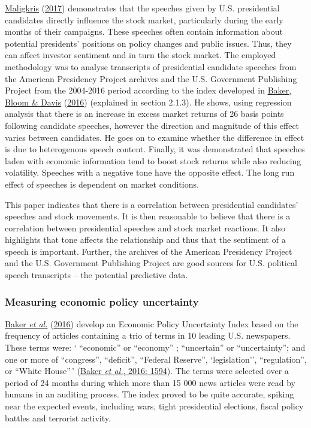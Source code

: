\documentclass[11pt,preprint, authoryear]{elsarticle}
\numberwithin{equation}{section}
\numberwithin{figure}{section}
\numberwithin{table}{section}
\begin{document}
\protect\hyperlink{ref-maligkris2017political}{Maligkris}
(\protect\hyperlink{ref-maligkris2017political}{2017}) demonstrates that
the speeches given by U.S. presidential candidates directly influence
the stock market, particularly during the early months of their
campaigns. These speeches often contain information about potential
presidents' positions on policy changes and public issues. Thus, they
can affect investor sentiment and in turn the stock market. The employed
methodology was to analyse transcripts of presidential candidate
speeches from the American Presidency Project archives and the U.S.
Government Publishing Project from the 2004-2016 period according to the
index developed in \protect\hyperlink{ref-baker2016measuring}{Baker,
Bloom \& Davis} (\protect\hyperlink{ref-baker2016measuring}{2016})
(explained in section 2.1.3). He shows, using regression analysis that
there is an increase in excess market returns of 26 basis points
following candidate speeches, however the direction and magnitude of
this effect varies between candidates. He goes on to examine whether the
difference in effect is due to heterogenous speech content. Finally, it
was demonstrated that speeches laden with economic information tend to
boost stock returns while also reducing volatility. Speeches with a
negative tone have the opposite effect. The long run effect of speeches
is dependent on market conditions.

This paper indicates that there is a correlation between presidential
candidates' speeches and stock movements. It is then reasonable to
believe that there is a correlation between presidential speeches and
stock market reactions. It also highlights that tone affects the
relationship and thus that the sentiment of a speech is important.
Further, the archives of the American Presidency Project and the U.S.
Government Publishing Project are good sources for U.S. political speech
transcripts -- the potential predictive data.

\hypertarget{measuring-economic-policy-uncertainty}{%
\subsubsection{Measuring economic policy
uncertainty}\label{measuring-economic-policy-uncertainty}}

\protect\hyperlink{ref-baker2016measuring}{Baker \emph{et al.}}
(\protect\hyperlink{ref-baker2016measuring}{2016}) develop an Economic
Policy Uncertainty Index based on the frequency of articles containing a
trio of terms in 10 leading U.S. newspapers. These terms were: `
``economic'' or ``economy'' ; ``uncertain'' or ``uncertainty''; and one
or more of ``congress'', ``deficit'', ``Federal Reserve'',
`legislation'', ``regulation'', or ``White House''\,'
(\protect\hyperlink{ref-baker2016measuring}{Baker \emph{et al.}, 2016:
1594}). The terms were selected over a period of 24 months during which
more than 15 000 news articles were read by humans in an auditing
process. The index proved to be quite accurate, spiking near the
expected events, including wars, tight presidential elections, fiscal
policy battles and terrorist activity.
\end{document}
